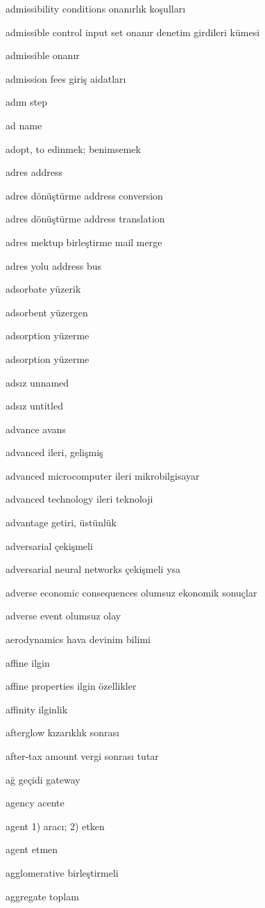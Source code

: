 \documentclass[12pt,fleqn]{article}\usepackage{../../common}
\begin{document}
admissibility conditions onanırlık koşulları

admissible control input set onanır denetim girdileri kümesi

admissible onanır

admission fees giriş aidatları

adım step

ad name

adopt, to edinmek; benimsemek

adres address

adres dönüştürme address conversion

adres dönüştürme address translation

adres mektup birleştirme mail merge

adres yolu address bus

adsorbate yüzerik

adsorbent yüzergen

adsorption yüzerme

adsorption yüzerme

adsız unnamed

adsız untitled

advance avans

advanced ileri, gelişmiş

advanced microcomputer ileri mikrobilgisayar

advanced technology ileri teknoloji

advantage getiri, üstünlük

adversarial çekişmeli

adversarial neural networks çekişmeli ysa

adverse economic consequences olumsuz ekonomik sonuçlar

adverse event olumsuz olay

aerodynamics hava devinim bilimi

affine ilgin 

affine properties ilgin özellikler

affinity ilginlik

afterglow kızarıklık sonrası

after-tax amount vergi sonrası tutar

ağ geçidi gateway

agency acente

agent 1) aracı; 2) etken

agent etmen

agglomerative birleştirmeli

aggregate toplam
\end{document}
